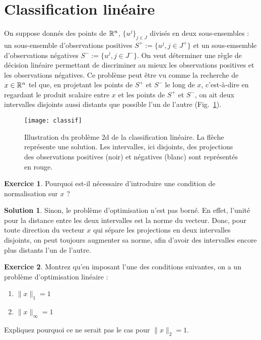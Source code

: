 \documentclass[a4paper,francais]{article}
\newcommand{\R}{{\ensuremath\mathbb{R}}}
\theoremstyle{definition}
\newtheorem{exercice}{Exercice}[section]
\newtheorem*{solution}{Solution}
\begin{document}
\section{Classification linéaire}
\label{sec:classif}

On suppose donnés des points de $\R^n$, $\{u^j\}_{j \in J}$ divisés en deux sous-ensembles :
un sous-ensemble d'observations positives $S^+ := \{ u^j, j \in J^+ \}$ et un sous-emsemble
d'observations négatives $S^- := \{ u^j, j \in J^- \}$. On veut déterminer une règle de décision linéaire
permettant de discriminer au mieux les observations positives et les observations négatives. Ce problème
peut être vu comme la recherche de $x \in \R^n$ tel que, en projetant les points de $S^+$ et $S^-$ le
long de $x$, c'est-à-dire en regardant le produit scalaire entre $x$ et les points de $S^+$ et $S^-$,
on ait deux intervalles disjoints aussi distants que possible l'un de l'autre (Fig.~\ref{fig:classif}).

\begin{figure}
  \centering
  \texttt{[image: classif]}
  \caption{Illustration du problème 2d de la classification linéaire.
    La flèche représente une solution.
    Les intervalles, ici disjoints, des projections des observations
    positives (noir) et négatives (blanc) sont représentés en rouge.  }
  \label{fig:classif}
\end{figure}

\begin{exercice}
  Pourquoi est-il nécessaire d'introduire une condition de normalisation sur $x$ ?
\end{exercice}

\begin{solution}
  Sinon, le problème d'optimisation n'est pas borné. En effet, l'unité pour la distance entre les deux
  intervalles est la norme du vecteur. Donc, pour toute direction du vecteur $x$ qui sépare les
  projections en deux intervalles disjoints, on peut toujours augmenter sa norme, afin d'avoir des
  intervalles encore plus distants l'un de l'autre.  
\end{solution}

\begin{exercice}
  Montrez qu'en imposant l'une des conditions suivantes, on a un problème d'optimisation linéaire :
  \begin{enumerate}
  \item\label{L1} $\|x\|_1 = 1$
  \item\label{Linf} $\|x\|_\infty = 1$
  \end{enumerate}
  Expliquez pourquoi ce ne serait pas le cas pour $\|x\|_2 = 1$.
\end{exercice}
\end{document}
